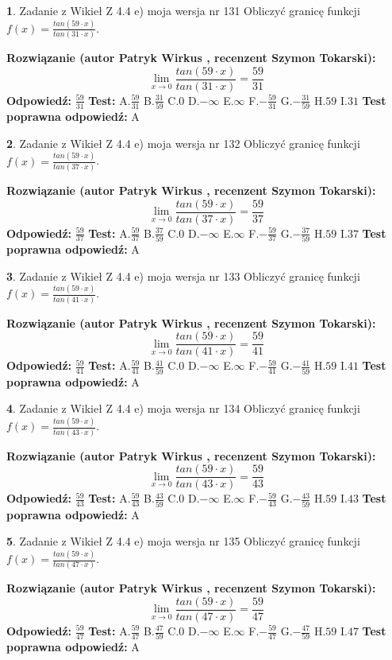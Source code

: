 \documentclass[12pt, a4paper]{article}
\theoremstyle{definition} %
\newtheorem{zad}{}
\newcommand{\zadStart}[1]{\begin{zad}#1\newline}
\newcommand{\zadStop}{\end{zad}}
\newcommand{\rozwStart}[2]{\noindent \textbf{Rozwiązanie (autor #1 , recenzent #2): }\newline}
\newcommand{\rozwStop}{\newline}
\newcommand{\odpStart}{\noindent \textbf{Odpowiedź:}\newline}
\newcommand{\odpStop}{\newline}
\newcommand{\testStart}{\noindent \textbf{Test:}\newline}
\newcommand{\testStop}{\newline}
\newcommand{\kluczStart}{\noindent \textbf{Test poprawna odpowiedź:}\newline}
\newcommand{\kluczStop}{\newline}
\begin{document}
\zadStart{Zadanie z Wikieł Z 4.4 e) moja wersja nr 131}
Obliczyć granicę funkcji $f(x)=\frac{tan(59\cdot x)}{tan(31\cdot x)}$.
\zadStop
\rozwStart{Patryk Wirkus}{Szymon Tokarski}
$$\lim\limits_{x\to 0}\frac{tan(59\cdot x)}{tan(31\cdot x)}=
\frac{59}{31}$$
\rozwStop
\odpStart
$\frac{59}{31}$
\odpStop
\testStart
A.$\frac{59}{31}$
B.$\frac{31}{59}$
C.$0$
D.$-\infty$
E.$\infty$
F.$-\frac{59}{31}$
G.$-\frac{31}{59}$
H.$59$
I.$31$
\testStop
\kluczStart
A
\kluczStop



\zadStart{Zadanie z Wikieł Z 4.4 e) moja wersja nr 132}
Obliczyć granicę funkcji $f(x)=\frac{tan(59\cdot x)}{tan(37\cdot x)}$.
\zadStop
\rozwStart{Patryk Wirkus}{Szymon Tokarski}
$$\lim\limits_{x\to 0}\frac{tan(59\cdot x)}{tan(37\cdot x)}=
\frac{59}{37}$$
\rozwStop
\odpStart
$\frac{59}{37}$
\odpStop
\testStart
A.$\frac{59}{37}$
B.$\frac{37}{59}$
C.$0$
D.$-\infty$
E.$\infty$
F.$-\frac{59}{37}$
G.$-\frac{37}{59}$
H.$59$
I.$37$
\testStop
\kluczStart
A
\kluczStop



\zadStart{Zadanie z Wikieł Z 4.4 e) moja wersja nr 133}
Obliczyć granicę funkcji $f(x)=\frac{tan(59\cdot x)}{tan(41\cdot x)}$.
\zadStop
\rozwStart{Patryk Wirkus}{Szymon Tokarski}
$$\lim\limits_{x\to 0}\frac{tan(59\cdot x)}{tan(41\cdot x)}=
\frac{59}{41}$$
\rozwStop
\odpStart
$\frac{59}{41}$
\odpStop
\testStart
A.$\frac{59}{41}$
B.$\frac{41}{59}$
C.$0$
D.$-\infty$
E.$\infty$
F.$-\frac{59}{41}$
G.$-\frac{41}{59}$
H.$59$
I.$41$
\testStop
\kluczStart
A
\kluczStop



\zadStart{Zadanie z Wikieł Z 4.4 e) moja wersja nr 134}
Obliczyć granicę funkcji $f(x)=\frac{tan(59\cdot x)}{tan(43\cdot x)}$.
\zadStop
\rozwStart{Patryk Wirkus}{Szymon Tokarski}
$$\lim\limits_{x\to 0}\frac{tan(59\cdot x)}{tan(43\cdot x)}=
\frac{59}{43}$$
\rozwStop
\odpStart
$\frac{59}{43}$
\odpStop
\testStart
A.$\frac{59}{43}$
B.$\frac{43}{59}$
C.$0$
D.$-\infty$
E.$\infty$
F.$-\frac{59}{43}$
G.$-\frac{43}{59}$
H.$59$
I.$43$
\testStop
\kluczStart
A
\kluczStop



\zadStart{Zadanie z Wikieł Z 4.4 e) moja wersja nr 135}
Obliczyć granicę funkcji $f(x)=\frac{tan(59\cdot x)}{tan(47\cdot x)}$.
\zadStop
\rozwStart{Patryk Wirkus}{Szymon Tokarski}
$$\lim\limits_{x\to 0}\frac{tan(59\cdot x)}{tan(47\cdot x)}=
\frac{59}{47}$$
\rozwStop
\odpStart
$\frac{59}{47}$
\odpStop
\testStart
A.$\frac{59}{47}$
B.$\frac{47}{59}$
C.$0$
D.$-\infty$
E.$\infty$
F.$-\frac{59}{47}$
G.$-\frac{47}{59}$
H.$59$
I.$47$
\testStop
\kluczStart
A
\kluczStop
\end{document}
